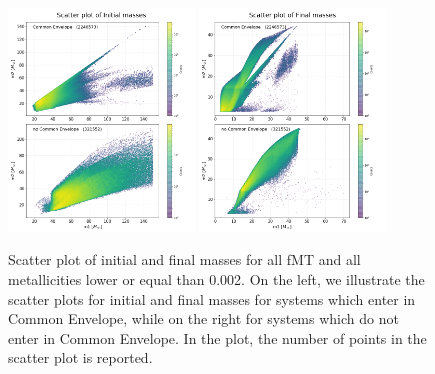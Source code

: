 \documentclass[prb,twocolumn,9pt]{revtex4-1}
\begin{document}
\begin{figure}[htp]
    \centering
    \includegraphics[width=0.44\textwidth]{images/assignment2_1/scatterInitial_masses.png} 
    \hskip 1mm
   \includegraphics[width=0.44\textwidth]{images/assignment2_1/scatterFinal_masses.png}
   \vskip -0.2cm
 \caption{Scatter plot of initial and final masses for all fMT and all metallicities lower or equal than 0.002.
    On the left, we illustrate the scatter plots for initial and final masses for systems which enter in Common Envelope, while on the right for systems which do not enter in Common Envelope. 
    In the plot, the number of points in the scatter plot is reported. }
    \label{fig:ass2_1_scatterplot}
\end{figure}
\end{document}
